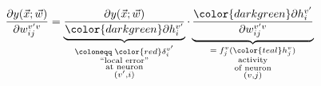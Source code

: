 \begin{frame}
    \pause 
    \\
    
    
    \begin{eqnarray}
        \frac{\partial y(\vec{x}; \vec{w})}{\partial w_{ij}^{v'v}}
            = \underbrace{\frac{\partial y(\vec{x}; \vec{w})}
                {{\color{darkgreen}\partial h_i^{v'}}} }_{ 
                    \substack{\coloneqq\;{\color{red}\delta_i^{v'}} \\
                    \text{``local error''} \\
                    \text{at neuron} \\
                    (v', i)}
                }
              \cdot 
              \underbrace{\frac{{\color{darkgreen}\partial h_i^{v'}}}
                {\partial w_{ij}^{v'v}}}_{
                    \substack{=\;f_j^v({\color{teal} h_j^v}) \\
                    \text{activity} \\
                    \text{of neuron} \\
                    (v, j)}}
                \label{eq:input_output_terms}
    \end{eqnarray}
    

\end{frame}
